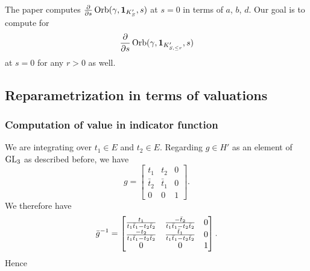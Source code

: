 The paper \cite{ref:AFL} computes $\pdv{}{s}\operatorname{Orb}(\gamma, \mathbf{1}_{K'_S}, s)$ at $s=0$
in terms of $a$, $b$, $d$.
Our goal is to compute for
\[ \pdv{}{s}\operatorname{Orb}(\gamma, \mathbf{1}_{K'_{S, \le r}}, s) \]
at $s=0$ for any $r > 0$ as well.

\subsection{Reparametrization in terms of valuations}
\subsubsection{Computation of value in indicator function}
We are integrating over $t_1 \in E$ and $t_2 \in E$.
Regarding $g \in H'$ as an element of $\operatorname{GL}_3$ as described before, we have
\[ g = \begin{bmatrix}
  t_1 & t_2 & 0  \\
  \bar t_2 & \bar t_1 & 0 \\
  0 & 0 & 1
  \end{bmatrix}. \]
We therefore have
\[ \bar g ^{-1} = \begin{bmatrix}
  \frac{t_1}{t_1 \bar t_1 - t_2 \bar t_2} & \frac{-\bar t_2}{t_1 \bar t_1 - t_2 \bar t_2} & 0 \\
  \frac{-t_2}{t_1 \bar t_1 - t_2 \bar t_2} & \frac{\bar t_1}{t_1 \bar t_1 - t_2 \bar t_2} & 0 \\
  0 & 0 & 1 \end{bmatrix}. \]
Hence
